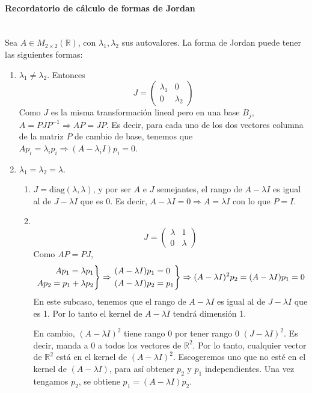 \documentclass[11pt, a4paper,twoside]{article}
\theoremstyle{theorem-style}  %
\theoremstyle{definition-style}
\theoremstyle{example-style}
\newenvironment{rcases}
{\left.\begin{aligned}}
	{\end{aligned}\right\rbrace}
\begin{document}
\paragraph{Recordatorio de cálculo de formas de Jordan}\ \\
	Sea $ A\in M_{2\times 2}(\mathbb{R}) $, con $ \lambda_1, \lambda_2 $ sus autovalores. La forma de Jordan puede tener las siguientes formas:
	\begin{enumerate}
		\item $ \lambda_1\neq \lambda_2 $. Entonces 
		\[ J=\begin{pmatrix}
		\lambda_1 &0\\
		0 &\lambda_2
		\end{pmatrix} \]
		Como $ J $ es la misma transformación lineal pero en una base $ B_j $, $ A=PJP^{-1} \Rightarrow AP=JP$. Es decir, para cada uno de los dos vectores columna de la matriz $ P $ de cambio de base, tenemos que $ Ap_i=\lambda_ip_i \Rightarrow (A-\lambda_iI)p_i=0$.
		\item $ \lambda_1= \lambda_2=\lambda $.
		\begin{enumerate}
			\item $ J=\text{diag}(\lambda,\lambda) $, y por ser $ A $ e $ J $ semejantes, el rango de $ A-\lambda I $ es igual al de $ J-\lambda I $ que es 0. Es decir, $ A-\lambda I =0 \Rightarrow A=\lambda I $ con lo que $ P=I $.
			\item \ 
			\[ J=\begin{pmatrix}
			\lambda &1\\
			0 &\lambda
			\end{pmatrix} \]
			Como $ AP=PJ $,
			\[ \begin{rcases}
			 Ap_1 = \lambda p_1\\
			 Ap_2 = p_1 + \lambda p_2
			\end{rcases} \Rightarrow \begin{rcases}
			&(A-\lambda I) p_1=0\\
			&(A-\lambda I) p_2=p_1
			\end{rcases}\Rightarrow  (A-\lambda I)^2p_2= (A-\lambda I) p_1=0   \]
			En este subcaso, tenemos que el rango de $ A-\lambda I $ es igual al de $ J-\lambda I $ que es 1. Por lo tanto el kernel de $ A-\lambda I $ tendrá dimensión 1.
			
			En cambio, $ (A-\lambda I)^2 $ tiene rango 0 por tener rango 0 $ (J-\lambda I)^2 $. Es decir, manda a 0 a todos los vectores de $ \mathbb{R}^2 $. Por lo tanto, cualquier vector de $ \mathbb{R}^2 $ está en el kernel de $ (A-\lambda I)^2 $. Escogeremos uno que no esté en el kernel de $ (A-\lambda I) $, para así obtener $ p_2 $ y $ p_1 $ independientes. Una vez tengamos $ p_2 $, se obtiene $ p_1= (A-\lambda I) p_2$.			
		\end{enumerate}
	\end{enumerate}
\end{document}
